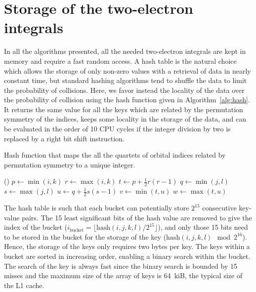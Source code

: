 \documentclass[./thesis.tex]{subfiles}
\begin{document}


\section{Storage of the two-electron integrals}
\label{sec:integrals}

In all the algorithms presented, all the needed two-electron integrals are kept in memory
and require a fast random access.
A hash table is the natural choice which allows the storage of only non-zero
values with a retrieval of data in nearly constant time,\cite{Maurer1975Mar} but standard hashing
algorithms tend to shuffle the data to limit the probability of collisions.
Here, we favor instead the locality of the data over the probability of collision
using the hash function given in Algorithm~\ref{alg:hash}. It returns the same
value for all the keys which are related by the permutation symmetry of the
indices, keeps some locality in the storage of the data, and can be evaluated
in the order of 10 CPU cycles if the integer division by two is replaced by a
right bit shift instruction.

\begin{algorithm}
 \caption{Hash function that maps the all the quartets of orbital indices related by permutation symmetry to a unique integer.}
 \label{alg:hash}
\Fn(){}{
        $p \gets \min (i,k)$ \;
        $r \gets \max (i,k)$ \;
        $t \gets p + \frac{1}{2} r (r-1)$ \;
        $q \gets \min (j,l)$ \;
        $s \gets \max (j,l)$ \;
        $u \gets q + \frac{1}{2} s (s-1)$ \;
        $v \gets \min (t,u)$ \;
        $w \gets \max (t,u)$ \;
         \;
}
\end{algorithm}

The hash table is such that each bucket can potentially store $2^{15}$
consecutive key-value pairs. The 15 least significant bits of the hash value
are removed to give the index of the bucket ($i_\text{bucket} =
\lfloor \text{hash}(i,j,k,l)/2^{15} \rfloor$), and only those 15 bits need to be
stored in the bucket for the storage of the key ($\text{hash}(i,j,k,l) \mod 2^{16}$).
Hence, the storage of the keys only requires two bytes per key.
The keys within a bucket are sorted in increasing order, enabling a binary
search within the bucket. The search of the key is always fast
since the binary search is bounded by 15 misses and the maximum size of the
array of keys is 64~kiB, the typical size of the L1 cache.
\end{document}
